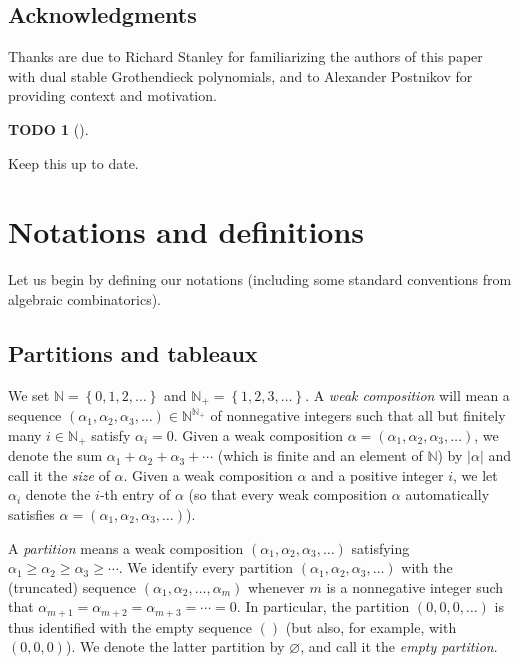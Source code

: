 \documentclass[numbers=enddot,12pt,final,onecolumn,notitlepage]{scrartcl}%
\theoremstyle{definition}
\newtheorem{quest}[theo]{TODO}
\newenvironment{todo}[1][]
{\begin{quest}[#1]\begin{leftbar}}
{\end{leftbar}\end{quest}}
\begin{document}
\subsection{Acknowledgments}

Thanks are due to Richard Stanley for familiarizing the authors of this paper
with dual stable Grothendieck polynomials, and to Alexander Postnikov for
providing context and motivation.

\begin{todo}
Keep this up to date.
\end{todo}

\section{\label{sect.notations}Notations and definitions}

Let us begin by defining our notations (including some standard conventions
from algebraic combinatorics).

\subsection{Partitions and tableaux}

We set $\mathbb{N}=\left\{  0,1,2,\ldots\right\}  $ and $\mathbb{N}%
_{+}=\left\{  1,2,3,\ldots\right\}  $. A \textit{weak composition} will mean a
sequence $\left(  \alpha_{1},\alpha_{2},\alpha_{3},\ldots\right)
\in\mathbb{N}^{\mathbb{N}_{+}}$ of nonnegative integers such that all but
finitely many $i\in\mathbb{N}_{+}$ satisfy $\alpha_{i}=0$. Given a weak
composition $\alpha=\left(  \alpha_{1},\alpha_{2},\alpha_{3},\ldots\right)  $,
we denote the sum $\alpha_{1}+\alpha_{2}+\alpha_{3}+\cdots$ (which is finite
and an element of $\mathbb{N}$) by $\left\vert \alpha\right\vert $ and call it
the \textit{size} of $\alpha$. Given a weak composition $\alpha$ and a
positive integer $i$, we let $\alpha_{i}$ denote the $i$-th entry of $\alpha$
(so that every weak composition $\alpha$ automatically satisfies
$\alpha=\left(  \alpha_{1},\alpha_{2},\alpha_{3},\ldots\right)  $).

A \textit{partition} means a weak composition $\left(  \alpha_{1},\alpha
_{2},\alpha_{3},\ldots\right)  $ satisfying $\alpha_{1}\geq\alpha_{2}%
\geq\alpha_{3}\geq\cdots$. We identify every partition $\left(  \alpha
_{1},\alpha_{2},\alpha_{3},\ldots\right)  $ with the (truncated) sequence
$\left(  \alpha_{1},\alpha_{2},\ldots,\alpha_{m}\right)  $ whenever $m$ is a
nonnegative integer such that $\alpha_{m+1}=\alpha_{m+2}=\alpha_{m+3}%
=\cdots=0$. In particular, the partition $\left(  0,0,0,\ldots\right)  $ is
thus identified with the empty sequence $\left(  {}\right)  $ (but also, for
example, with $\left(  0,0,0\right)  $). We denote the latter partition by
$\varnothing$, and call it the \textit{empty partition}.
\end{document}
